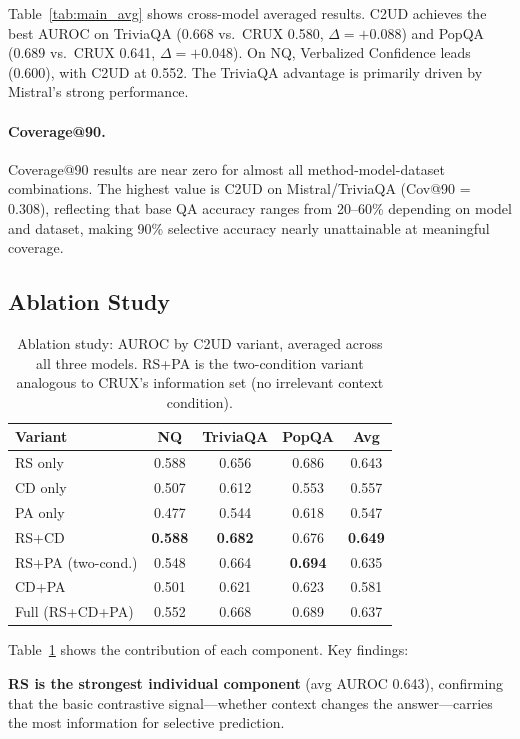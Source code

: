 \documentclass{article}
\newcommand{\ours}{\textsc{C2UD}}
\begin{document}
Table~\ref{tab:main_avg} shows cross-model averaged results.
\ours{} achieves the best AUROC on TriviaQA (0.668 vs.\ CRUX 0.580, $\Delta = +0.088$) and PopQA (0.689 vs.\ CRUX 0.641, $\Delta = +0.048$).
On NQ, Verbalized Confidence leads (0.600), with \ours{} at 0.552.
The TriviaQA advantage is primarily driven by Mistral's strong performance.

\paragraph{Coverage@90.}
Coverage@90 results are near zero for almost all method-model-dataset combinations.
The highest value is \ours{} on Mistral/TriviaQA (Cov@90 = 0.308), reflecting that base QA accuracy ranges from 20--60\% depending on model and dataset, making 90\% selective accuracy nearly unattainable at meaningful coverage.

\subsection{Ablation Study}

\begin{table}[t]
\caption{Ablation study: AUROC by \ours{} variant, averaged across all three models. RS+PA is the two-condition variant analogous to CRUX's information set (no irrelevant context condition).}
\label{tab:ablation}
\centering
\begin{tabular}{lcccc}
\toprule
Variant & NQ & TriviaQA & PopQA & Avg \\
\midrule
RS only & 0.588 & 0.656 & 0.686 & 0.643 \\
CD only & 0.507 & 0.612 & 0.553 & 0.557 \\
PA only & 0.477 & 0.544 & 0.618 & 0.547 \\
\midrule
RS+CD & \textbf{0.588} & \textbf{0.682} & 0.676 & \textbf{0.649} \\
RS+PA (two-cond.) & 0.548 & 0.664 & \textbf{0.694} & 0.635 \\
CD+PA & 0.501 & 0.621 & 0.623 & 0.581 \\
Full (RS+CD+PA) & 0.552 & 0.668 & 0.689 & 0.637 \\
\bottomrule
\end{tabular}
\end{table}

Table~\ref{tab:ablation} shows the contribution of each component.
Key findings:

\textbf{RS is the strongest individual component} (avg AUROC 0.643), confirming that the basic contrastive signal---whether context changes the answer---carries the most information for selective prediction.
\end{document}
